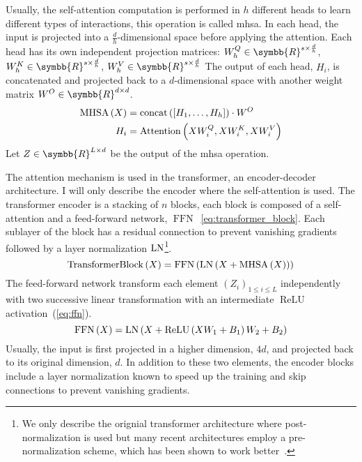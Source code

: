 \documentclass[../main.tex]{subfiles}
\begin{document}
		Usually, the self-attention computation is performed in \(h\) different heads to learn different types of interactions, this operation is called \gls{mhsa}.
		In each head, the input is projected into a \(\frac{d}{h}\)-dimensional space before applying the attention.
		Each head has its own independent projection matrices: \(W^Q_h \in \symbb{R}^{s \times \frac{d}{h}}\), \(W^K_h \in \symbb{R}^{s \times \frac{d}{h}}\), \(W^V_h \in \symbb{R}^{s \times \frac{d}{h}}\)
		The output of each head, \(H_i\), is concatenated and projected back to a \(d\)-dimensional space with another weight matrix \(W^O \in \symbb{R}^{d \times d}\).
		\begin{align}
			\operatorname{MHSA}\left(X\right) & = \operatorname{concat}\left(\left[H_1, \ldots, H_h \right] \right)\cdot W^O \\
			H_i                 & = \operatorname{Attention}\left(XW^Q_i, XW^K_i, XW^V_i\right)
		\end{align}
		Let \(Z \in \symbb{R}^{L \times d}\) be the output of the \gls{mhsa} operation.

		The attention mechanism is used in the transformer, an encoder-decoder architecture.
		I will only describe the encoder where the self-attention is used.
		The transformer encoder is a stacking of \(n\) blocks, each block is composed of a self-attention and a feed-forward network, \(\operatorname{FFN}\)~\cref{eq:transformer_block}.
		Each sublayer of the block has a residual connection to prevent vanishing gradients followed by a layer normalization \(\operatorname{LN}\)\footnote{We only describe the orignial transformer architecture where post-normalization is used but many recent architectures employ a pre-normalization scheme, which has been shown to work better~\cite{TransformerpreLN}.}.
		\begin{equation}
			\operatorname{TransformerBlock}\left(X\right) = \operatorname{FFN}\left(\LN\left(X + \MHSA\left(X\right)\right)\right)\label{eq:transformer_block}
		\end{equation}
		The feed-forward network transform each element \({\left(Z_i\right)}_{1 \leq i \leq L}\) independently with two successive linear transformation with an intermediate \(\operatorname{ReLU}\) activation~(\cref{eq:ffn}).
		\begin{equation}%
			\operatorname{FFN}\left(X\right) = \LN\left( X + \operatorname{ReLU}\left(XW_1 + B_1\right)W_2 + B_2\right) \label{eq:ffn}
		\end{equation}
		Usually, the input is first projected in a higher dimension, \(4d\), and projected back to its original dimension, \(d\).
		In addition to these two elements, the encoder blocks include a layer normalization known to speed up the training and skip connections to prevent vanishing gradients.
\end{document}
